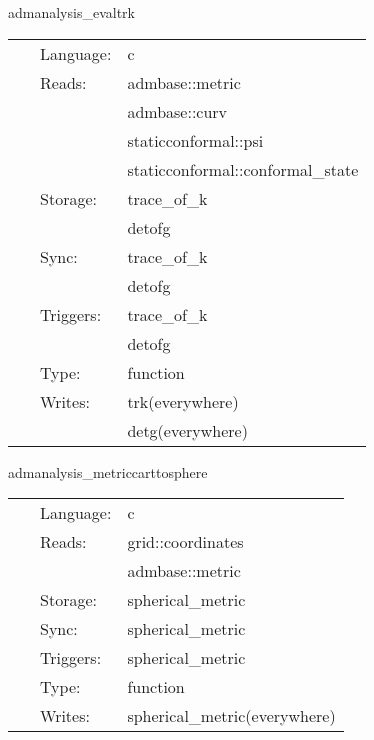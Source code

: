 \vspace{5mm}


\hspace{5mm} admanalysis\_evaltrk 

\hspace{5mm}{\it compute the trace of the extrinsic curvature and the determinant of the metric } 


\hspace{5mm}

 \begin{tabular*}{160mm}{cll} 
~ & Language:  & c \\ 
~ & Reads:  & admbase::metric \\ 
~& ~ &admbase::curv\\ 
~& ~ &staticconformal::psi\\ 
~& ~ &staticconformal::conformal\_state\\ 
~ & Storage:  & trace\_of\_k \\ 
~& ~ &detofg\\ 
~ & Sync:  & trace\_of\_k \\ 
~& ~ &detofg\\ 
~ & Triggers:  & trace\_of\_k \\ 
~& ~ &detofg\\ 
~ & Type:  & function \\ 
~ & Writes:  & trk(everywhere) \\ 
~& ~ &detg(everywhere)\\ 
\end{tabular*} 


\vspace{5mm}


\hspace{5mm} admanalysis\_metriccarttosphere 

\hspace{5mm}{\it calculate the spherical metric in r,theta(q), phi(p) } 


\hspace{5mm}

 \begin{tabular*}{160mm}{cll} 
~ & Language:  & c \\ 
~ & Reads:  & grid::coordinates \\ 
~& ~ &admbase::metric\\ 
~ & Storage:  & spherical\_metric \\ 
~ & Sync:  & spherical\_metric \\ 
~ & Triggers:  & spherical\_metric \\ 
~ & Type:  & function \\ 
~ & Writes:  & spherical\_metric(everywhere) \\ 
\end{tabular*} 


